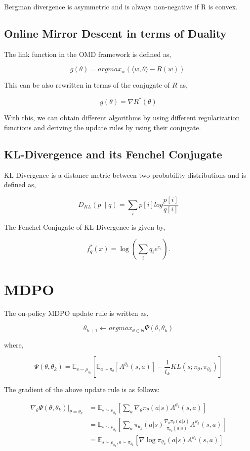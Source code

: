 Bergman divergence is asymmetric and is always non-negative if R is convex.

\subsection{Online Mirror Descent in terms of Duality}

The link function in the OMD framework is defined as,

$$g(\theta) = argmax_w (\langle w, \theta \rangle - R(w)).$$

This can be also rewritten in terms of the conjugate of $R$ as,

$$g(\theta) = \nabla R^*(\theta)$$

With this, we can obtain different algorithms by using different regularization functions and deriving 
the update rules by using their conjugate.

\subsection{KL-Divergence and its Fenchel Conjugate}

KL-Divergence is a distance metric between two probability distributions and is defined as,

$$D_{KL}(p \| q) = \sum_i p[i] log \frac{p[i]}{q[i]}$$


The Fenchel Conjugate of KL-Divergence is given by,

$$f^*_q(x) = \log (\sum_i q_i e^{x_i}).$$


\section{MDPO}

The on-policy MDPO update rule is written as,

$$\theta_{k+1} \leftarrow argmax_{\theta \in \Theta} \Psi(\theta, \theta_k)$$

where,

$$\Psi(\theta, \theta_k) = \mathbb{E}_{s \sim \rho_{\theta_{k}}} [\mathbb{E}_{a \sim \pi_{\theta}}[A^{\theta_k}(s, a)] - \frac{1}{t_k} KL(s; \pi_{\theta}, \pi_{\theta_k})]$$


The gradient of the above update rule is as follows:

\begin{align*}
    \nabla_{\theta} \Psi(\theta, \theta_k) |_{\theta=\theta_k}
                                    &= \mathbb{E}_{s \sim \rho_{\theta_k}} [\sum_a \nabla_{\theta} \pi_{\theta} (a|s) A^{\theta_k}(s, a)] \\
                                    &= \mathbb{E}_{s \sim \rho_{\theta_k}} [\sum_a \pi_{\theta_k}(a|s) \frac{\nabla_{\theta} \pi_{\theta}(a|s)}{\pi_{\theta_k}(a|s)}  A^{\theta_k}(s, a)] \\
                                    &= \mathbb{E}_{s \sim \rho_{\theta_k}, a \sim \pi_{\theta_k}} [\nabla \log \pi_{\theta_k} (a|s) A^{\theta_k}(s,a)]
\end{align*}

